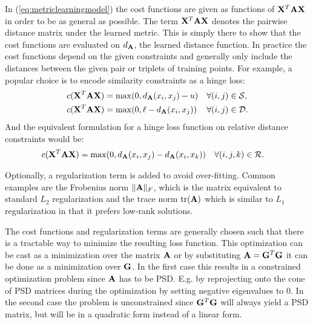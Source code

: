 In (\ref{eq:metriclearningmodel}) the cost functions are given as functions of $\mathbf{X}^T\mathbf{A}\mathbf{X}$ in order to be as general as possible. The term $\mathbf{X}^T\mathbf{A}\mathbf{X}$ denotes the pairwise distance matrix under the learned metric. This is simply there to show that the cost functions are evaluated on $d_{\mathbf{A}}$, the learned distance function. In practice the cost functions depend on the given constraints and generally only include the distances between the given pair or triplets of training points. For example, a popular choice is to encode similarity constraints as a hinge loss: 
\begin{align}
c(\mathbf{X}^T\mathbf{A}\mathbf{X}) &= \max(0,d_{\mathbf{A}}(x_i, x_j) - u)  &\forall (i,j) &\in \mathcal{S}, \\
c(\mathbf{X}^T\mathbf{A}\mathbf{X}) &= \max(0,\ell - d_{\mathbf{A}}(x_i, x_j)) &\forall (i,j) &\in \mathcal{D}.
\end{align}
And the equivalent formulation for a hinge loss function on relative distance constraints would be:
\begin{align}
c(\mathbf{X}^T\mathbf{A}\mathbf{X}) &= \max(0,d_{\mathbf{A}}(x_i, x_j) - d_{\mathbf{A}}(x_i, x_k)) &\forall (i,j,k) &\in \mathcal{R}.
\end{align}

Optionally, a regularization term is added to avoid over-fitting. Common examples are the Frobenius norm $\|\mathbf{A}\|_F$, which is the matrix equivalent to standard $L_2$ regularization and the trace norm $\text{tr}(\mathbf{A})$ which is similar to $L_1$ regularization in that it prefers low-rank solutions.

The cost functions and regularization terms are generally chosen such that there is a tractable way to minimize the resulting loss function. This optimization can be cast as a minimization over the matrix $\mathbf{A}$ or by substituting $\mathbf{A} = \mathbf{G}^T\mathbf{G}$ it can be done as a minimization over $\mathbf{G}$. In the first case this results in a constrained optimization problem since $\mathbf{A}$ has to be \ac{PSD}. E.g. by reprojecting onto the cone of \ac{PSD} matrices during the optimization  by setting negative eigenvalues to 0. In the second case the problem is unconstrained since $\mathbf{G}^T\mathbf{G}$ will always yield a \ac{PSD} matrix, but will be in a quadratic form instead of a linear form.










